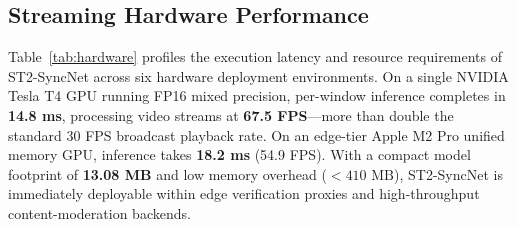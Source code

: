 \documentclass[journal]{IEEEtran}
\begin{document}
\begin{table}[!t]
\caption{Real-Time Inference Latency and Hardware Acceleration Telemetry}
\label{tab:hardware}
\centering
{}
\end{table}

\subsection{Streaming Hardware Performance}
Table~\ref{tab:hardware} profiles the execution latency and resource requirements of ST2-SyncNet across six hardware deployment environments. On a single NVIDIA Tesla T4 GPU running FP16 mixed precision, per-window inference completes in \textbf{14.8 ms}, processing video streams at \textbf{67.5 FPS}—more than double the standard 30 FPS broadcast playback rate. On an edge-tier Apple M2 Pro unified memory GPU, inference takes \textbf{18.2 ms} (54.9 FPS). With a compact model footprint of \textbf{13.08 MB} and low memory overhead ($< 410\text{ MB}$), ST2-SyncNet is immediately deployable within edge verification proxies and high-throughput content-moderation backends.
\end{document}

